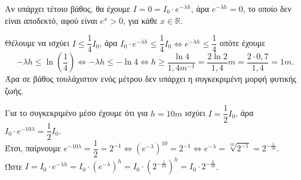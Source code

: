 \begin{alist}
\item Αν υπάρχει τέτοιο βάθος, θα έχουμε $I = 0 = I_0 \cdot e^{-\lambda h}$, άρα $e^{-\lambda h} = 0$, το οποίο δεν είναι αποδεκτό, αφού είναι $e^x > 0$, για κάθε $x \in \mathbb{R}$.
\item Θέλουμε να ισχύει $I \le \dfrac{1}{4}I_0$, άρα $I_0 \cdot e^{-\lambda h} \le \dfrac{1}{4}I_0 \Leftrightarrow e^{-\lambda h} \le \dfrac{1}{4}$ οπότε έχουμε
\[-\lambda h \le \ln\left(\frac{1}{4}\right) \Leftrightarrow -\lambda h \le -\ln 4 \Leftrightarrow h \ge \frac{\ln 4}{1{,}4 m^{-1}} = \frac{2\ln 2}{1{,}4} m = \frac{2 \cdot 0{,}7}{1{,}4} = 1 m.\]
Άρα σε βάθος τουλάχιστον ενός μέτρου δεν υπάρχει η συγκεκριμένη μορφή φυτικής ζωής.
\item Για το συγκεκριμένο μέσο έχουμε ότι για $h = 10 m$ ισχύει $I = \dfrac{1}{2}I_0$, άρα $I_0 \cdot e^{-10\lambda} = \dfrac{1}{2}I_0$. \\
Έτσι, παίρνουμε $e^{-10\lambda} = \dfrac{1}{2} = 2^{-1} \Leftrightarrow \left(e^{-\lambda}\right)^{10} = 2^{-1} \Leftrightarrow e^{-\lambda} = \sqrt[10]{2^{-1}} = 2^{-\frac{1}{10}}$. \\
Ώστε $I = I_0 \cdot e^{-\lambda h} = I_0 \cdot \left(e^{-\lambda}\right)^h = I_0 \cdot \left(2^{-\frac{1}{10}}\right)^h = I_0 \cdot 2^{-\frac{h}{10}}$.
\end{alist}

